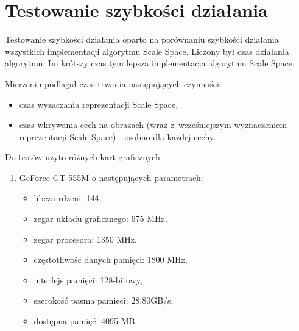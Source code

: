 \section{Testowanie szybkości działania}
\label{sec:testSzybkosc1}

Testowanie szybkości działania oparto na porównaniu szybkości działania wszystkich implementacji algorytmu Scale Space. Liczony był czas działania algorytmu. Im krótszy czas tym lepsza implementacja algorytmu Scale Space.

Mierzeniu podlagał czas trwania następujących czynności:
\begin{itemize}
\item czas wyzaczania reprezentacji Scale Space,
\item czas wkrywania cech na obrazach (wraz z~wcześniejszym wyznaczeniem reprezentacji Scale Space) - osobno dla każdej cechy.
\end{itemize}

Do testów użyto różnych kart graficznych.
\begin{enumerate}
\item GeForce GT 555M \cite{GT555M} o następujących parametrach:
\begin{itemize}
\item libcza rdzeni: 144,
\item zegar układu graficznego: 675 MHz,
\item zegar procesora: 1350 MHz,
\item częstotliwość danych pamięci: 1800 MHz,
\item interfejs pamięci: 128-bitowy,
\item szerokość pasma pamięci: 28,80GB/s,
\item dostępna pamięć: 4095 MB.
\end{itemize}
\end{enumerate}



